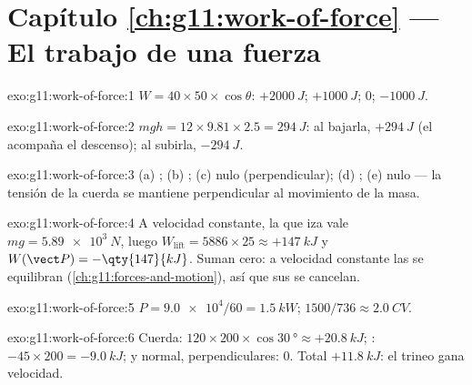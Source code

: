 \section*{Capítulo \ref{ch:g11:work-of-force} --- El trabajo de una fuerza}

\begin{solution}{exo:g11:work-of-force:1}
$W = 40 \times 50 \times \cos\theta$: $+\qty{2000}{J}$;
$+\qty{1000}{J}$; $0$; $-\qty{1000}{J}$.
\end{solution}

\begin{solution}{exo:g11:work-of-force:2}
$mgh = 12 \times 9.81 \times 2.5 = \qty{294}{J}$: al bajarla,
$+\qty{294}{J}$ (el  acompaña el descenso); al subirla,
$-\qty{294}{J}$.
\end{solution}

\begin{solution}{exo:g11:work-of-force:3}
(a) ; (b) ; (c) nulo (perpendicular); (d) ;
(e) nulo --- la tensión de la cuerda se mantiene perpendicular al
movimiento de la masa.
\end{solution}

\begin{solution}{exo:g11:work-of-force:4}
A velocidad constante, la  que iza vale
$mg = \qty{5.89e3}{N}$, luego
$W_{\text{lift}} = 5886 \times 25 \approx +\qty{147}{kJ}$ y
$W(\vect P) = -\qty{147}{kJ}$. Suman cero: a velocidad constante las
 se equilibran (\cref{ch:g11:forces-and-motion}), así que sus
 se cancelan.
\end{solution}

\begin{solution}{exo:g11:work-of-force:5}
$P = \num{9.0e4}/60 = \qty{1.5}{kW}$; $1500/736 \approx \qty{2.0}{CV}$.
\end{solution}

\begin{solution}{exo:g11:work-of-force:6}
Cuerda: $120 \times 200 \times \cos\qty{30}{\degree} \approx
+\qty{20.8}{kJ}$; : $-45 \times 200 = -\qty{9.0}{kJ}$;  y
 normal, perpendiculares: $0$. Total $+\qty{11.8}{kJ}$: el trineo
gana velocidad.
\end{solution}

